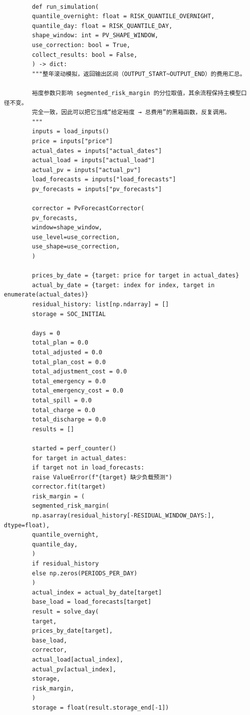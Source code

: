 \documentclass[UTF8]{ctexart}
\begin{document}
\begin{verbatim}
        
        def run_simulation(
        quantile_overnight: float = RISK_QUANTILE_OVERNIGHT,
        quantile_day: float = RISK_QUANTILE_DAY,
        shape_window: int = PV_SHAPE_WINDOW,
        use_correction: bool = True,
        collect_results: bool = False,
        ) -> dict:
        """整年滚动模拟，返回输出区间（OUTPUT_START~OUTPUT_END）的费用汇总。
        
        裕度参数只影响 segmented_risk_margin 的分位取值，其余流程保持主模型口径不变。
        完全一致，因此可以把它当成“给定裕度 → 总费用”的黑箱函数，反复调用。
        """
        inputs = load_inputs()
        price = inputs["price"]
        actual_dates = inputs["actual_dates"]
        actual_load = inputs["actual_load"]
        actual_pv = inputs["actual_pv"]
        load_forecasts = inputs["load_forecasts"]
        pv_forecasts = inputs["pv_forecasts"]
        
        corrector = PvForecastCorrector(
        pv_forecasts,
        window=shape_window,
        use_level=use_correction,
        use_shape=use_correction,
        )
        
        prices_by_date = {target: price for target in actual_dates}
        actual_by_date = {target: index for index, target in enumerate(actual_dates)}
        residual_history: list[np.ndarray] = []
        storage = SOC_INITIAL
        
        days = 0
        total_plan = 0.0
        total_adjusted = 0.0
        total_plan_cost = 0.0
        total_adjustment_cost = 0.0
        total_emergency = 0.0
        total_emergency_cost = 0.0
        total_spill = 0.0
        total_charge = 0.0
        total_discharge = 0.0
        results = []
        
        started = perf_counter()
        for target in actual_dates:
        if target not in load_forecasts:
        raise ValueError(f"{target} 缺少负载预测")
        corrector.fit(target)
        risk_margin = (
        segmented_risk_margin(
        np.asarray(residual_history[-RESIDUAL_WINDOW_DAYS:], dtype=float),
        quantile_overnight,
        quantile_day,
        )
        if residual_history
        else np.zeros(PERIODS_PER_DAY)
        )
        actual_index = actual_by_date[target]
        base_load = load_forecasts[target]
        result = solve_day(
        target,
        prices_by_date[target],
        base_load,
        corrector,
        actual_load[actual_index],
        actual_pv[actual_index],
        storage,
        risk_margin,
        )
        storage = float(result.storage_end[-1])
        

\end{verbatim}
\end{document}
